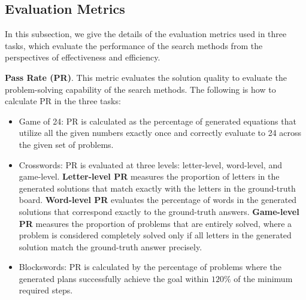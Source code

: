 \subsection{Evaluation Metrics}
\label{appendix:evaluation_metrics}
In this subsection, we give the details of the evaluation metrics used in three tasks, which evaluate the performance of the search methods from the perspectives of effectiveness and efficiency.

\noindent \textbf{Pass Rate (PR)}. This metric evaluates the solution quality to evaluate the problem-solving capability of the search methods. The following is how to calculate PR in the three tasks:
\begin{itemize}[leftmargin=*]
    \item Game of 24: PR is calculated as the percentage of generated equations that utilize all the given numbers exactly once and correctly evaluate to 24 across the given set of problems.
    \item Crosswords: PR is evaluated at three levels: letter-level, word-level, and game-level. \textbf{Letter-level PR} measures the proportion of letters in the generated solutions that match exactly with the letters in the ground-truth board. \textbf{Word-level PR} evaluates the percentage of words in the generated solutions that correspond exactly to the ground-truth answers. \textbf{Game-level PR} measures the proportion of problems that are entirely solved, where a problem is considered completely solved only if all letters in the generated solution match the ground-truth answer precisely.
    \item Blockswords: PR is calculated by the percentage of problems where the generated plans successfully achieve the goal within $120\%$ of the minimum required steps.
\end{itemize}


